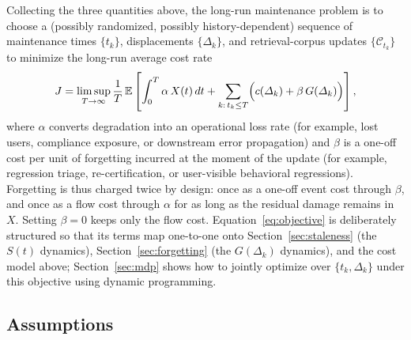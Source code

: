 \documentclass[electronics,article,submit,pdftex,moreauthors]{Definitions/mdpi}
\newcommand{\D}{\varDelta}                 %
\newcommand{\E}{\mathbb{E}}
\newcommand{\calC}{\mathcal{C}}
\begin{document}
Collecting the three quantities above, the long-run maintenance problem is to choose a (possibly randomized, possibly history-dependent) sequence of maintenance times $\{t_k\}$, displacements $\{\D_k\}$, and retrieval-corpus updates $\{\calC_{t_k}\}$ to minimize the long-run average cost rate
\begin{equation}\label{eq:objective}
J=\limsup_{T\to\infty}\frac{1}{T}\,\E\left[\int_0^T\alpha\,X(t)\,dt+\sum_{k:\,t_k\le T}\Bigl(c(\D_k)+\beta\,G(\D_k)\Bigr)\right],
\end{equation}
where $\alpha$ converts degradation into an operational loss rate (for example, lost users, compliance exposure, or downstream error propagation) and $\beta$ is a one-off cost per unit of forgetting incurred at the moment of the update (for example, regression triage, re-certification, or user-visible behavioral regressions). Forgetting is thus charged twice by design: once as a one-off event cost through $\beta$, and once as a flow cost through $\alpha$ for as long as the residual damage remains in $X$. Setting $\beta=0$ keeps only the flow cost. Equation~\eqref{eq:objective} is deliberately structured so that its terms map one-to-one onto Section~\ref{sec:staleness} (the $S(t)$ dynamics), Section~\ref{sec:forgetting} (the $G(\D_k)$ dynamics), and the cost model above; Section~\ref{sec:mdp} shows how to jointly optimize over $\{t_k,\D_k\}$ under this objective using dynamic programming.

\subsection{Assumptions}\label{sec:assumptions}
\end{document}
